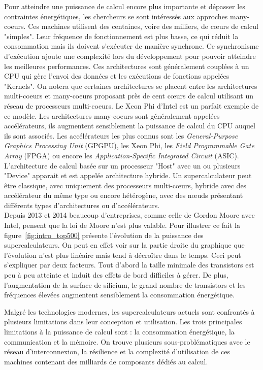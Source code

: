 \documentclass[12pt,a4paper]{report}
\begin{document}
Pour atteindre une puissance de calcul encore plus importante et dépasser les contraintes énergétiques, les chercheurs se sont intéressés aux approches many-coeurs. 
Ces machines utilisent des centaines, voire des milliers, de cœurs de calcul "simples".
Leur fréquence de fonctionnement est plus basse, ce qui réduit la consommation mais ils doivent s'exécuter de manière synchrone. 
Ce synchronisme d'exécution ajoute une complexité lors du développement pour pouvoir atteindre les meilleures performances.
Ces architectures sont généralement couplées à un CPU qui gère l'envoi des données et les exécutions de fonctions appelées "Kernels".
On notera que certaines architectures se placent entre les architectures multi-coeurs et many-coeurs proposant près de cent cœurs de calcul utilisant un réseau de processeurs multi-coeurs.
Le Xeon Phi d'Intel est un parfait exemple de ce modèle. 
Les architectures many-coeurs sont généralement appelées accélérateurs, ils augmentent sensiblement la puissance de calcul du CPU auquel ils sont associés. 
Les accélérateurs les plus connus sont les \textit{General-Purpose Graphics Processing Unit} (GPGPU), les Xeon Phi, les \textit{Field Programmable Gate Array} (FPGA) ou encore les \textit{Application-Specific Integrated Circuit} (ASIC).
L'architecture de calcul basée sur un processeur "Host" avec un ou plusieurs "Device" apparait et est appelée architecture hybride. 
Un supercalculateur peut être classique, avec uniquement des processeurs multi-cœurs, hybride avec des accélérateur du même type ou encore hétérogène, avec des nœuds présentant différents types d'architectures ou d'accélérateurs. \\

Depuis 2013 et 2014 beaucoup d'entreprises, comme celle de Gordon Moore avec Intel, pensent que la loi de Moore n'est plus valable. 
Pour illustrer ce fait la figure~\ref{fig:intro_top500} présente l'évolution de la puissance des supercalculateurs. 
On peut en effet voir sur la partie droite du graphique que l'évolution n'est plus linéaire mais tend à décroître dans le temps. 
Ceci peut s'expliquer par deux facteurs.
Tout d'abord la taille minimale des transistors est peu à peu atteinte et induit des effets de bord difficiles à gérer. 
De plus, l'augmentation de la surface de silicium, le grand nombre de transistors et les fréquences élevées augmentent sensiblement la consommation énergétique. 

Malgré les technologies modernes, les supercalculateurs actuels sont confrontés à plusieurs limitations dans leur conception et utilisation.
Les trois principales limitations à la puissance de calcul sont : la consommation énergétique, la communication et la mémoire. 
On trouve plusieurs sous-problématiques avec le réseau d'interconnexion, la résilience et la complexité d'utilisation de ces machines contenant des milliards de composants dédiés au calcul.\\
\end{document}
